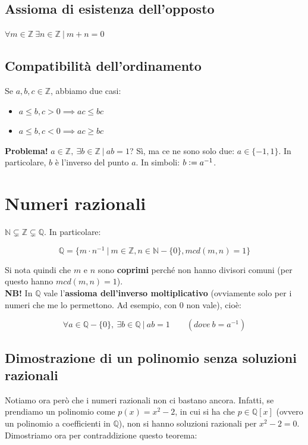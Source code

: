 \documentclass{article}
\begin{document}
\subsection{Assioma di esistenza dell'opposto}
$\forall m \in \mathbb{Z} \ \exists n \in \mathbb{Z} \ | \ m + n = 0$

\subsection{Compatibilità dell'ordinamento}
Se $a,b,c \in \mathbb{Z}$, abbiamo due casi: 

\begin{itemize}
    \item $a \leq b, c > 0 \implies ac \leq bc$
    \item $a \leq b, c < 0 \implies ac \geq bc$
\end{itemize}

\noindent\textbf{Problema!} $a \in \mathbb{Z}, \ \exists b \in \mathbb{Z} \ | \ ab = 1$? Sì, ma ce ne sono solo due: $a \in \{ -1, 1 \}$. In particolare, $b$ è l'inverso del punto $a$. In simboli: $b \vcentcolon = a^{-1}$.

\section{Numeri razionali}
$\mathbb{N} \subsetneq \mathbb{Z} \subsetneq \mathbb{Q}$. In particolare:

\begin{equation*}
    \mathbb{Q} = \{ m \cdot n^{-1} \ | \ m \in \mathbb{Z}, n \in \mathbb{N} - \{ 0 \}, mcd(m,n) = 1 \}
\end{equation*}

\noindent Si nota quindi che $m$ e $n$ sono \textbf{coprimi} perché non hanno divisori comuni (per questo hanno $mcd(m,n) = 1$). \\

\noindent\textbf{NB!} In $\mathbb{Q}$ vale l'\textbf{assioma dell'inverso moltiplicativo} (ovviamente solo per i numeri che me lo permettono. Ad esempio, con 0 non vale), cioè: 

\begin{equation*}
    \forall a \in \mathbb{Q} - \{ 0 \}, \ \exists b \in \mathbb{Q} \ | \ ab = 1 \qquad (dove \ b = a^{-1})
\end{equation*}

\subsection{Dimostrazione di un polinomio senza soluzioni razionali}
\noindent Notiamo ora però che i numeri razionali non ci bastano ancora. Infatti, se prendiamo un polinomio come $p(x) = x^2 - 2$, in cui si ha che $p \in \mathbb{Q}[x]$ (ovvero un polinomio a coefficienti in $\mathbb{Q}$), non si hanno soluzioni razionali per $x^2 - 2 = 0$. Dimostriamo ora per contraddizione questo teorema: \\
\end{document}
